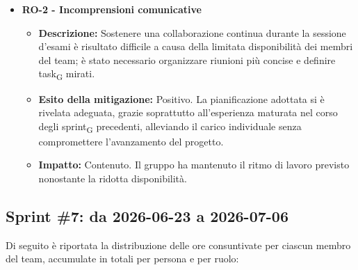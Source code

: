 \documentclass[a4paper, 10pt, colorlinks=true, linkcolor=black, urlcolor=blue, citecolor=blue, hidelinks]{article}
\begin{document}
\begin{itemize}
\begin{itemize}
\begin{itemize}
            \item \textbf{Impatto:} Contenuto. Lo slittamento ha riguardato pochi giorni e non ha inciso sulla qualità della documentazione né sugli obiettivi complessivi della RTB\textsubscript{G}.
        \end{itemize}
        \item \textbf{RO-2 - Incomprensioni comunicative}
        \begin{itemize}
            \item \textbf{Descrizione:} Sostenere una collaborazione continua durante la sessione d'esami è risultato difficile a causa della limitata disponibilità dei membri del team; è stato necessario organizzare riunioni più concise e definire task\textsubscript{G} mirati.
            \item \textbf{Esito della mitigazione:} Positivo. La pianificazione adottata si è rivelata adeguata, grazie soprattutto all'esperienza maturata nel corso degli sprint\textsubscript{G} precedenti, alleviando il carico individuale senza compromettere l'avanzamento del progetto.
            \item \textbf{Impatto:} Contenuto. Il gruppo ha mantenuto il ritmo di lavoro previsto nonostante la ridotta disponibilità.
        \end{itemize}
    \end{itemize}
\end{itemize}

\subsection{Sprint \#7: da 2026-06-23 a 2026-07-06}
Di seguito è riportata la distribuzione delle ore consuntivate per ciascun membro del team, accumulate in totali per persona e per ruolo:
\end{document}
